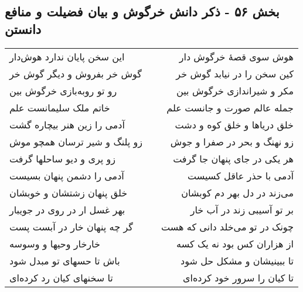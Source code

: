 \begin{center}
\section*{بخش ۵۶ - ذکر دانش خرگوش و بیان فضیلت و منافع دانستن}
\label{sec:sh056}
\begin{longtable}{l p{0.5cm} r}
این سخن پایان ندارد هوش‌دار
&&
هوش سوی قصهٔ خرگوش دار
\\
گوش خر بفروش و دیگر گوش خر
&&
کین سخن را در نیابد گوش خر
\\
رو تو روبه‌بازی خرگوش بین
&&
مکر و شیراندازی خرگوش بین
\\
خاتم ملک سلیمانست علم
&&
جمله عالم صورت و جانست علم
\\
آدمی را زین هنر بیچاره گشت
&&
خلق دریاها و خلق کوه و دشت
\\
زو پلنگ و شیر ترسان همچو موش
&&
زو نهنگ و بحر در صفرا و جوش
\\
زو پری و دیو ساحلها گرفت
&&
هر یکی در جای پنهان جا گرفت
\\
آدمی را دشمن پنهان بسیست
&&
آدمی با حذر عاقل کسیست
\\
خلق پنهان زشتشان و خوبشان
&&
می‌زند در دل بهر دم کوبشان
\\
بهر غسل ار در روی در جویبار
&&
بر تو آسیبی زند در آب خار
\\
گر چه پنهان خار در آبست پست
&&
چونک در تو می‌خلد دانی که هست
\\
خارخار وحیها و وسوسه
&&
از هزاران کس بود نه یک کسه
\\
باش تا حسهای تو مبدل شود
&&
تا ببینیشان و مشکل حل شود
\\
تا سخنهای کیان رد کرده‌ای
&&
تا کیان را سرور خود کرده‌ای
\\
\end{longtable}
\end{center}
